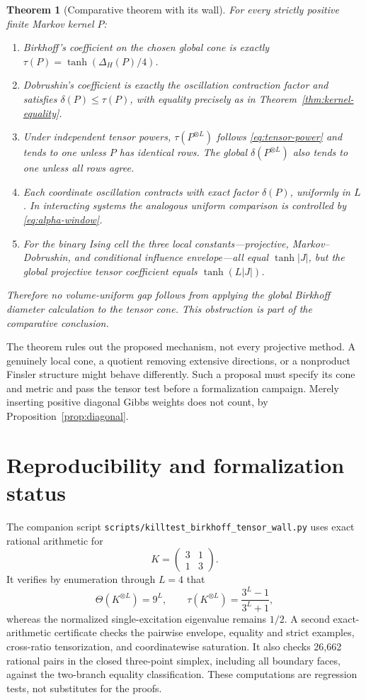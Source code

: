 \documentclass[11pt]{article}
\newtheorem{theorem}{Theorem}[section]
\newcommand{\diamH}{\Delta_{H}}
\newcommand{\1}{\mathbf{1}}
\begin{document}
\begin{theorem}[Comparative theorem with its wall]\label{thm:main-wall}
For every strictly positive finite Markov kernel $P$:
\begin{enumerate}[label=(\arabic*)]
\item Birkhoff's coefficient on the chosen global cone is exactly
$\tau(P)=\tanh(\diamH(P)/4)$.
\item Dobrushin's coefficient is exactly the oscillation contraction factor
and satisfies $\delta(P)\leq\tau(P)$, with equality precisely as in
Theorem~\ref{thm:kernel-equality}.
\item Under independent tensor powers, $\tau(P^{\otimes L})$ follows
\eqref{eq:tensor-power} and tends to one unless $P$ has identical rows.
The global $\delta(P^{\otimes L})$ also tends to one unless all rows agree.
\item Each coordinate oscillation contracts with exact factor $\delta(P)$,
uniformly in $L$.  In interacting systems the analogous uniform comparison
is controlled by \eqref{eq:alpha-window}.
\item For the binary Ising cell the three local constants---projective,
Markov--Dobrushin, and conditional influence envelope---all equal
$\tanh|J|$, but the global projective tensor coefficient equals
$\tanh(L|J|)$.
\end{enumerate}
Therefore no volume-uniform gap follows from applying the global Birkhoff
diameter calculation to the tensor cone.  This obstruction is part of the
comparative conclusion.
\end{theorem}

The theorem rules out the proposed mechanism, not every projective method.
A genuinely local cone, a quotient removing extensive directions, or a
nonproduct Finsler structure might behave differently.  Such a proposal must
specify its cone and metric and pass the tensor test before a formalization
campaign.  Merely inserting positive diagonal Gibbs weights does not count,
by Proposition~\ref{prop:diagonal}.

\section{Reproducibility and formalization status}

The companion script
\texttt{scripts/killtest\_birkhoff\_tensor\_wall.py} uses exact rational
arithmetic for
\[
 K=\begin{pmatrix}3&1\\1&3\end{pmatrix}.
\]
It verifies by enumeration through $L=4$ that
\[
 \Theta(K^{\otimes L})=9^L,\qquad
 \tau(K^{\otimes L})=\frac{3^L-1}{3^L+1},
\]
whereas the normalized single-excitation eigenvalue remains $1/2$.  A second
exact-arithmetic certificate checks the pairwise envelope, equality and
strict examples, cross-ratio tensorization, and coordinatewise saturation.
It also checks 26,662 rational pairs in the closed three-point simplex,
including all boundary faces, against the two-branch equality classification.
These computations are regression tests, not substitutes for the proofs.
\end{document}
